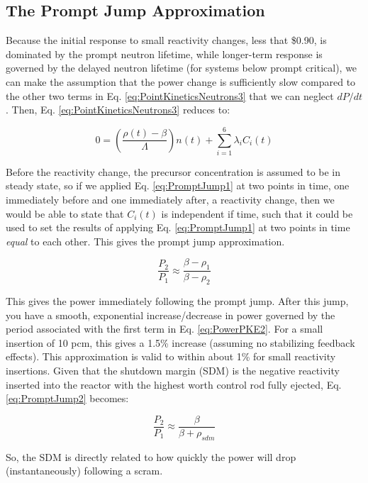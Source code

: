 \documentclass[10pt]{article}
\begin{document}
\begin{flushleft}
\subsection{The Prompt Jump Approximation}

Because the initial response to small reactivity changes, less that \$0.90, is dominated by the prompt neutron lifetime, while longer-term response is governed by the delayed neutron lifetime (for systems below prompt critical), we can make the assumption that the power change is sufficiently slow compared to the other two terms in Eq. \ref{eq:PointKineticsNeutrons3} that we can neglect \(dP/dt\). Then, Eq. \ref{eq:PointKineticsNeutrons3} reduces to:

\begin{equation}
\label{eq:PromptJump1}
0=\left(\frac{\rho(t)-\beta}{\Lambda}\right)n(t)+\sum_{i=1}^{6}\lambda_iC_i(t)
\end{equation} 

Before the reactivity change, the precursor concentration is assumed to be in steady state, so if we applied Eq. \ref{eq:PromptJump1} at two points in time, one immediately before and one immediately after, a reactivity change, then we would be able to state that \(C_i(t)\) is independent if time, such that it could be used to set the results of applying Eq. \ref{eq:PromptJump1} at two points in time \textit{equal} to each other. This gives the prompt jump approximation.

\begin{equation}
\label{eq:PromptJump2}
\frac{P_2}{P_1}\approx\frac{\beta-\rho_1}{\beta-\rho_2}
\end{equation} 

This gives the power immediately following the prompt jump. After this jump, you have a smooth, exponential increase/decrease in power governed by the period associated with the first term in Eq. \ref{eq:PowerPKE2}. For a small insertion of 10 pcm, this gives a 1.5\% increase (assuming no stabilizing feedback effects). This approximation is valid to within about 1\% for small reactivity insertions. Given that the shutdown margin (SDM) is the negative reactivity inserted into the reactor with the highest worth control rod fully ejected, Eq. \ref{eq:PromptJump2} becomes:

\begin{equation}
\label{eq:PromptJumpSDM}
\frac{P_2}{P_1}\approx\frac{\beta}{\beta+\rho_{sdm}}
\end{equation} 

So, the SDM is directly related to how quickly the power will drop (instantaneously) following a scram.










\end{flushleft}
\end{document}
